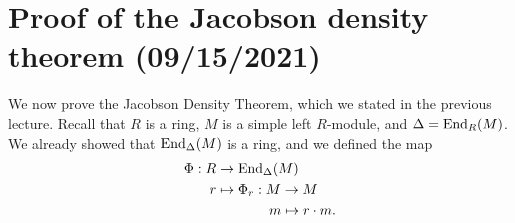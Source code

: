 \section{Proof of the Jacobson density theorem (09/15/2021)}

We now prove the Jacobson Density Theorem, which we stated in the previous lecture. Recall that 
$R$ is a ring, $M$ is a simple left $R$-module, and $\Delta = \operatorname{End}_R(M)$. We already showed that 
$\operatorname{End}_\Delta(M)$ is a ring, and we defined the map 
\begin{align*}
    \Phi : R &\to \operatorname{End}_\Delta(M) \\
    r &\mapsto \Phi_r : M \to M \\
    & \hspace{1.33cm} m \mapsto r \cdot m.
\end{align*}

